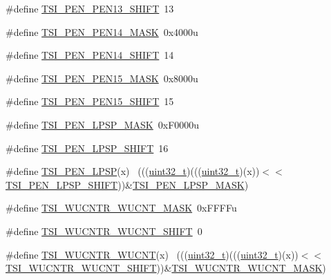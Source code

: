 \begin{DoxyCompactItemize}
\item 
\#define \hyperlink{group___t_s_i___register___masks_gaa2beb25ccfcccb7bb0032fa6f42b80f7}{T\+S\+I\+\_\+\+P\+E\+N\+\_\+\+P\+E\+N13\+\_\+\+S\+H\+I\+FT}~13
\item 
\#define \hyperlink{group___t_s_i___register___masks_gaa4403e6fd78c53717c22d34c9d082d8c}{T\+S\+I\+\_\+\+P\+E\+N\+\_\+\+P\+E\+N14\+\_\+\+M\+A\+SK}~0x4000u
\item 
\#define \hyperlink{group___t_s_i___register___masks_ga20c8a6fee93df97db5d2191bd6d72b09}{T\+S\+I\+\_\+\+P\+E\+N\+\_\+\+P\+E\+N14\+\_\+\+S\+H\+I\+FT}~14
\item 
\#define \hyperlink{group___t_s_i___register___masks_ga1cbf93a7b5646316b3013106b096951c}{T\+S\+I\+\_\+\+P\+E\+N\+\_\+\+P\+E\+N15\+\_\+\+M\+A\+SK}~0x8000u
\item 
\#define \hyperlink{group___t_s_i___register___masks_ga06472a71ff605b918f36b6dd770bff9c}{T\+S\+I\+\_\+\+P\+E\+N\+\_\+\+P\+E\+N15\+\_\+\+S\+H\+I\+FT}~15
\item 
\#define \hyperlink{group___t_s_i___register___masks_ga5c60f0233573e0a5436a8bf87600d347}{T\+S\+I\+\_\+\+P\+E\+N\+\_\+\+L\+P\+S\+P\+\_\+\+M\+A\+SK}~0x\+F0000u
\item 
\#define \hyperlink{group___t_s_i___register___masks_ga8a4314c8664c97a0304050452d85779b}{T\+S\+I\+\_\+\+P\+E\+N\+\_\+\+L\+P\+S\+P\+\_\+\+S\+H\+I\+FT}~16
\item 
\#define \hyperlink{group___t_s_i___register___masks_ga2c49a1ebc890fb8e3d4e7468c516d8fd}{T\+S\+I\+\_\+\+P\+E\+N\+\_\+\+L\+P\+SP}(x)                                                ~(((\hyperlink{_p_e___types_8h_a33594304e786b158f3fb30289278f5af}{uint32\+\_\+t})(((\hyperlink{_p_e___types_8h_a33594304e786b158f3fb30289278f5af}{uint32\+\_\+t})(x))$<$$<$\hyperlink{group___t_s_i___register___masks_ga8a4314c8664c97a0304050452d85779b}{T\+S\+I\+\_\+\+P\+E\+N\+\_\+\+L\+P\+S\+P\+\_\+\+S\+H\+I\+FT}))\&\hyperlink{group___t_s_i___register___masks_ga5c60f0233573e0a5436a8bf87600d347}{T\+S\+I\+\_\+\+P\+E\+N\+\_\+\+L\+P\+S\+P\+\_\+\+M\+A\+SK})
\item 
\#define \hyperlink{group___t_s_i___register___masks_gaa12e0ab73453118119dc56599e0a5598}{T\+S\+I\+\_\+\+W\+U\+C\+N\+T\+R\+\_\+\+W\+U\+C\+N\+T\+\_\+\+M\+A\+SK}~0x\+F\+F\+F\+Fu
\item 
\#define \hyperlink{group___t_s_i___register___masks_gab6de5e2e100b2608c1837b6114fb5117}{T\+S\+I\+\_\+\+W\+U\+C\+N\+T\+R\+\_\+\+W\+U\+C\+N\+T\+\_\+\+S\+H\+I\+FT}~0
\item 
\#define \hyperlink{group___t_s_i___register___masks_gabfa380c87734a1e8d767c8f743906660}{T\+S\+I\+\_\+\+W\+U\+C\+N\+T\+R\+\_\+\+W\+U\+C\+NT}(x)                                        ~(((\hyperlink{_p_e___types_8h_a33594304e786b158f3fb30289278f5af}{uint32\+\_\+t})(((\hyperlink{_p_e___types_8h_a33594304e786b158f3fb30289278f5af}{uint32\+\_\+t})(x))$<$$<$\hyperlink{group___t_s_i___register___masks_gab6de5e2e100b2608c1837b6114fb5117}{T\+S\+I\+\_\+\+W\+U\+C\+N\+T\+R\+\_\+\+W\+U\+C\+N\+T\+\_\+\+S\+H\+I\+FT}))\&\hyperlink{group___t_s_i___register___masks_gaa12e0ab73453118119dc56599e0a5598}{T\+S\+I\+\_\+\+W\+U\+C\+N\+T\+R\+\_\+\+W\+U\+C\+N\+T\+\_\+\+M\+A\+SK})

\end{DoxyCompactItemize}
